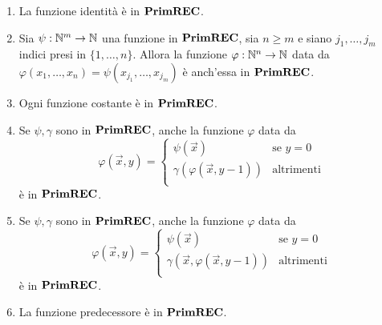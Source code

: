 \documentclass[runningheads,a4paper]{llncs}
\begin{document}
\begin{lemma}\label{def:alt-ric-prim1}
\begin{enumerate}[label=(\roman*)]
\item La funzione identit\`{a} \`{e} in $\mathbf{PrimREC}$.
\item Sia $\psi: \mathbb{N}^m \to \mathbb{N}$ una funzione in $\mathbf{PrimREC}$, sia $n \geq m$ e siano ${j_1},\ldots,{j_m}$ indici presi in $\{1,\ldots,n\}$. Allora la funzione $\varphi: \mathbb{N}^n \to \mathbb{N}$ data da\\
$\varphi(x_1,\ldots,x_n) = \psi(x_{j_1},\ldots,x_{j_m})$ \`{e} anch'essa in $\mathbf{PrimREC}$.
\item Ogni funzione costante \`{e} in $\mathbf{PrimREC}$.
\item Se $\psi,\gamma$ sono in $\mathbf{PrimREC}$, anche la funzione $\varphi$ data da 
$$
\varphi(\vec x,y) = 
\begin{cases}
\psi(\vec x) & \mbox{se } y = 0 \\
\gamma(\varphi(\vec x,y-1)) & \mbox{altrimenti} \\
\end{cases}
$$
\`{e} in $\mathbf{PrimREC}$.
\item Se $\psi,\gamma$ sono in $\mathbf{PrimREC}$, anche la funzione $\varphi$ data da 
$$
\varphi(\vec x,y) = 
\begin{cases}
\psi(\vec x) & \mbox{se } y = 0 \\
\gamma(\vec x,\varphi(\vec x,y-1)) & \mbox{altrimenti} \\
\end{cases}
$$
\`{e} in $\mathbf{PrimREC}$.
\item La funzione predecessore \`{e} in $\mathbf{PrimREC}$.
\end{enumerate}
\end{lemma}
\end{document}
